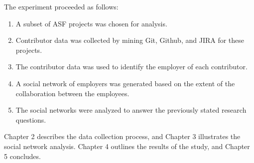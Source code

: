 The experiment proceeded as follows:
\begin{enumerate}
	\item A subset of ASF projects was chosen for analysis.
	\item Contributor data was collected by mining Git, Github, and JIRA for these projects.
	\item The contributor data was used to identify the employer of each contributor.
	\item A social network of employers was generated based on the extent of the collaboration between the employees.
	\item The social networks were analyzed to answer the previously stated research questions.
\end{enumerate}
Chapter 2 describes the data collection process, and Chapter 3 illustrates the social network analysis. Chapter 4 outlines the results of the study, and Chapter 5 concludes.